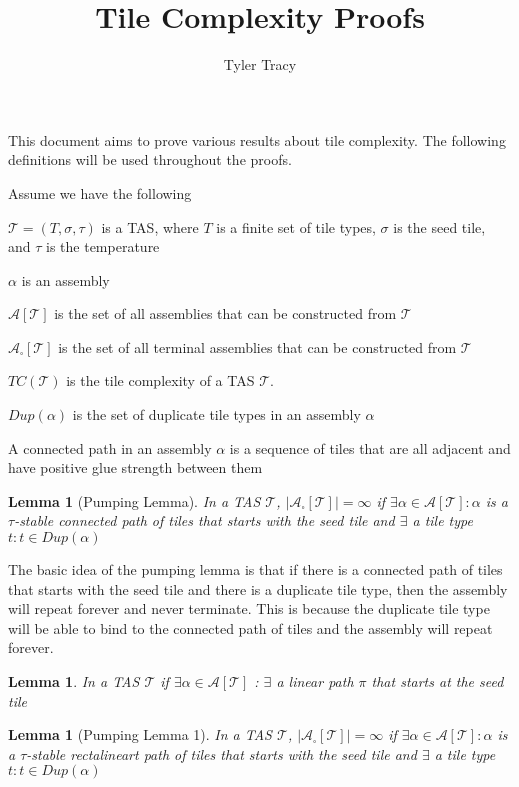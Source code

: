 \documentclass[12pt]{article}
\title{Tile Complexity Proofs}
\author{Tyler Tracy}
\newtheorem{lemma}[theorem]{Lemma}
\begin{document}
\maketitle


This document aims to prove various results about tile complexity. The following definitions will be used throughout the proofs.

Assume we have the following

$\mathcal{T} = (T, \sigma, \tau)$ is a TAS, where $T$ is a finite set of tile types, $\sigma$ is the seed tile, and $\tau$ is the temperature


$\alpha$ is an assembly

$\mathcal{A}[\mathcal{T}]$ is the set of all assemblies that can be constructed from $\mathcal{T}$

$\mathcal{A}_{\square}[\mathcal{T}]$ is the set of all terminal assemblies that can be constructed from $\mathcal{T}$

$TC(\mathcal{T})$ is the tile complexity of a TAS $\mathcal{T}$.

$Dup(\alpha)$ is the set of duplicate tile types in an assembly $\alpha$

A connected path in an assembly $\alpha$ is a sequence of tiles that are all adjacent and have positive glue strength between them


\begin{lemma}[Pumping Lemma]
	In a TAS $\mathcal{T}$, $|\mathcal{A}_{\square}[\mathcal{T}]| = \infty$ if $\exists \alpha \in \mathcal{A}[\mathcal{T}] : \alpha$ is a $\tau$-stable connected path of tiles that starts with the seed tile and $\exists$ a tile type $t : t \in Dup(\alpha)$
\end{lemma}

The basic idea of the pumping lemma is that if there is a connected path of tiles that starts with the seed tile and there is a duplicate tile type, then the assembly will repeat forever and never terminate. This is because the duplicate tile type will be able to bind to the connected path of tiles and the assembly will repeat forever.

\begin{lemma}
    In a TAS $\mathcal{T}$ if $\exists \alpha \in \mathcal{A}[\mathcal{T}]$ : $\exists$ a linear path $\pi$ that starts at the seed tile 

\end{lemma}


\begin{lemma}[Pumping Lemma 1]
	In a TAS $\mathcal{T}$, $|\mathcal{A}_{\square}[\mathcal{T}]| = \infty$ if $\exists \alpha \in \mathcal{A}[\mathcal{T}] : \alpha$ is a $\tau$-stable rectalineart path of tiles that starts with the seed tile and $\exists$ a tile type $t : t \in Dup(\alpha)$
\end{lemma}
\end{document}
